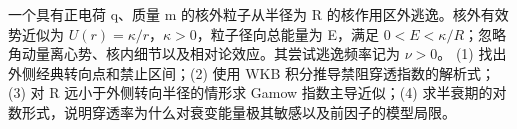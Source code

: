一个具有正电荷 q、质量 m 的核外粒子从半径为 R 的核作用区外逃逸。核外有效势近似为 \(U(r)=\kappa /r\)，\(\kappa >0\)，粒子径向总能量为 E，满足 \(0<E<\kappa /R\)；忽略角动量离心势、核内细节以及相对论效应。其尝试逃逸频率记为 \(\nu >0\)。
(1) 找出外侧经典转向点和禁止区间；(2) 使用 WKB 积分推导禁阻穿透指数的解析式；(3) 对 R 远小于外侧转向半径的情形求 Gamow 指数主导近似；(4) 求半衰期的对数形式，说明穿透率为什么对衰变能量极其敏感以及前因子的模型局限。
